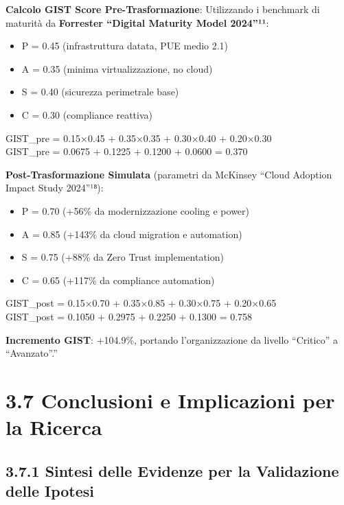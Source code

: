 \documentclass[12pt,a4paper,oneside]{book}
\providecommand{\tightlist}{%
  \setlength{\itemsep}{0pt}\setlength{\parskip}{0pt}
}
\numberwithin{figure}{chapter} %
\numberwithin{table}{chapter}  %
\begin{document}
\textbf{Calcolo GIST Score Pre-Trasformazione}: Utilizzando i benchmark
di maturità da \textbf{Forrester ``Digital Maturity Model 2024''¹¹}:

\begin{itemize}
\tightlist
\item
  P = 0.45 (infrastruttura datata, PUE medio 2.1)\\
\item
  A = 0.35 (minima virtualizzazione, no cloud)\\
\item
  S = 0.40 (sicurezza perimetrale base)\\
\item
  C = 0.30 (compliance reattiva)
\end{itemize}

GIST\_pre = 0.15×0.45 + 0.35×0.35 + 0.30×0.40 + 0.20×0.30\\
GIST\_pre = 0.0675 + 0.1225 + 0.1200 + 0.0600 = 0.370

\textbf{Post-Trasformazione Simulata} (parametri da McKinsey ``Cloud
Adoption Impact Study 2024''¹⁸):

\begin{itemize}
\tightlist
\item
  P = 0.70 (+56\% da modernizzazione cooling e power)\\
\item
  A = 0.85 (+143\% da cloud migration e automation)\\
\item
  S = 0.75 (+88\% da Zero Trust implementation)\\
\item
  C = 0.65 (+117\% da compliance automation)
\end{itemize}

GIST\_post = 0.15×0.70 + 0.35×0.85 + 0.30×0.75 + 0.20×0.65\\
GIST\_post = 0.1050 + 0.2975 + 0.2250 + 0.1300 = 0.758

\textbf{Incremento GIST}: +104.9\%, portando l'organizzazione da livello
``Critico'' a ``Avanzato''.''

\section{3.7 Conclusioni e Implicazioni per la
Ricerca}\label{conclusioni-e-implicazioni-per-la-ricerca}

\subsection{3.7.1 Sintesi delle Evidenze per la Validazione delle
Ipotesi}\label{sintesi-delle-evidenze-per-la-validazione-delle-ipotesi}
\end{document}
